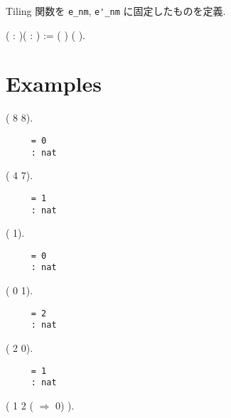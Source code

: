 \documentclass[12pt]{report}
\begin{document}
Tiling 関数を \verb|e_nm|, \verb|e'_nm| に固定したものを定義.
 \begin{coqdoccode}
\coqdocemptyline
\coqdocnoindent
{}  (  : )( : ) :=\coqdoceol
\coqdocindent{0.50em}
    (  ) (  ).\coqdoceol
\coqdocemptyline
\end{coqdoccode}

\section{Examples}
 \begin{coqdoccode}
\coqdocemptyline
\coqdocnoindent
{} ( 8 8).\coqdoceol
\end{coqdoccode}
 
\begin{verbatim}
     = 0
     : nat
\end{verbatim}
  \begin{coqdoccode}
\coqdocemptyline
\coqdocnoindent
{} ( 4 7).\coqdoceol
\end{coqdoccode}
 
\begin{verbatim}
     = 1
     : nat
\end{verbatim}
  \begin{coqdoccode}
\coqdocemptyline
\coqdocnoindent
{} ( 1).\coqdoceol
\end{coqdoccode}
 
\begin{verbatim}
     = 0
     : nat
\end{verbatim}
  \begin{coqdoccode}
\coqdocemptyline
\coqdocnoindent
{} ( 0 1).\coqdoceol
\end{coqdoccode}
 
\begin{verbatim}
     = 2
     : nat
\end{verbatim}
  \begin{coqdoccode}
\coqdocemptyline
\coqdocnoindent
{} ( 2 0).\coqdoceol
\end{coqdoccode}
 
\begin{verbatim}
     = 1
     : nat
\end{verbatim}
  \begin{coqdoccode}
\coqdocemptyline
\coqdocnoindent
{} ( 1 2 ( \coqdocvar{\_} \coqdocvar{\_} \ensuremath{\Rightarrow} 0)  ).\coqdoceol
\end{coqdoccode}
 
\end{document}
